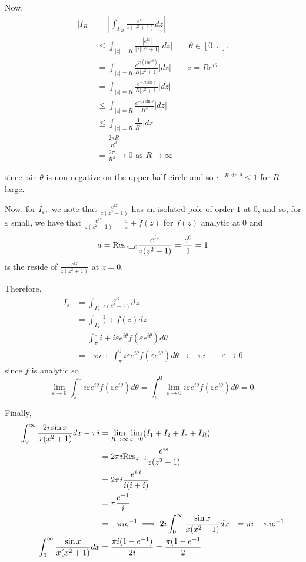 \documentclass[12pt]{Qual}
\begin{document}
\begin{solution}
Now, \begin{align*}
    |I_R|&=\left|\int_{\Gamma_R}\frac{e^{iz}}{z(z^2+1)}dz\right|\\
    &\le\int_{|z|=R}\frac{|e^{iz}|}{|z||z^2+1|}|dz|\qquad \theta\in[0,\pi].\\
    &=\int_{|z|=R}\frac{e^{\Re(iRe^{i\theta})}}{R|z^2+1|}|dz|\qquad z=Re^{i\theta}\\
    &=\int_{|z|=R}\frac{e^{-R\sin\theta}}{R|z^2+1|}|dz|\\
    &\le\int_{|z|=R}\frac{e^{-R\sin\theta}}{R^3}|dz|\\
    &\le \int_{|z|=R}\frac{1}{R^3}|dz|\\
    &=\frac{2\pi R}{R^3}\\
    &=\frac{2\pi}{R^2}\to0\text{ as }R\to\infty
\end{align*}

since $\sin\theta$ is non-negative on the upper half circle and so $e^{-R\sin\theta}\le1$ for $R$ large.

Now, for $I_\varepsilon,$ we note that $\frac{e^{iz}}{z(z^2+1)}$ has an isolated pole of order $1$ at $0$, and so, for $\varepsilon$ small, we have that $\frac{e^{iz}}{z(z^2+1)}=\frac{a}{z}+f(z)$ for $f(z)$ analytic at $0$ and $$a=\text{Res}_{z=0}\frac{e^{iz}}{z(z^2+1)}=\frac{e^{0}}{1}=1$$ is the reside of $\frac{e^{iz}}{z(z^2+1)}$ at $z=0.$

Therefore, \begin{align*}
    I_\varepsilon&=\int_{\Gamma_\varepsilon}\frac{e^{iz}}{z(z^2+1)}dz\\
    &=\int_{\Gamma_\varepsilon}\frac{1}{z}+f(z)dz\\
    &=\int_\pi^0i+i\varepsilon e^{i\theta}f(\varepsilon e^{i\theta})d\theta\\
    &=-\pi i+\int_\pi^0i\varepsilon e^{i\theta}f(\varepsilon e^{i\theta})d\theta\to-\pi i\qquad\varepsilon\to0
\end{align*}  since $f$ is analytic so $$\lim_{\varepsilon\to0}\int_\pi^0i\varepsilon e^{i\theta}f(\varepsilon e^{i\theta})d\theta=\int_\pi^0\lim_{\varepsilon\to0}i\varepsilon e^{i\theta}f(\varepsilon e^{i\theta})d\theta=0.$$

Finally, \begin{align*}
    \int_0^\infty\frac{2i\sin x}{x(x^2+1)}dx-\pi i&=\lim_{R\to\infty}\lim_{\varepsilon\to 0}(I_1+I_2+I_\varepsilon+I_R)\\
    &=2\pi i \text{Res}_{z=i}\frac{e^{iz}}{z(z^2+1)}\\
    &=2\pi i\frac{e^{i\cdot i}}{i(i+i)}\\
    &=\pi \frac{e^{-1}}{i}\\
    &=-\pi i e^{-1}
    \implies 2i\int_0^\infty\frac{\sin x}{x(x^2+1)}dx&=\pi i-\pi ie^{-1}\\
    \int_0^\infty\frac{\sin x}{x(x^2+1)}dx&=\frac{\pi i(1-e^{-1})}{2i}=\frac{\pi(1-e^{-1}}{2}
\end{align*}
\end{solution}
\newpage
\end{document}
